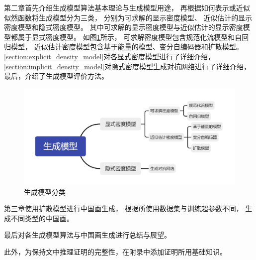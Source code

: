 第二章首先介绍生成模型算法基本理论与生成模型用途，
再根据如何表示或近似似然函数将生成模型分为三类，
分别为可求解的显示密度模型、
近似估计的显示密度模型和隐式密度模型。
其中可求解的显示密度模型与近似估计的显示密度模型都属于显式密度模型。
如图{\ref{fig:gennerative_models}}所示，
可求解密度模型包含规范化流模型和自回归模型，
近似估计密度模型包含基于能量的模型、变分自编码器和扩散模型。
{\ref{section:explicit_density_model}}对各显式密度模型进行了详细介绍，
{\ref{section:implicit_density_model}}对隐式密度模型生成对抗网络进行了详细介绍，
最后，介绍了生成模型评价方法。
\begin{figure}[ht]
    \centering
    \includegraphics[width=\textwidth]{figures/gennerative_models}
    \caption{生成模型分类}\label{fig:gennerative_models}
\end{figure}



第三章使用扩散模型进行中国画生成，
根据所使用数据集与训练超参数不同，
生成不同类型的中国画。

最后对各生成模型算法与中国画生成进行总结与展望。

此外，为保持文中推理证明的完整性，在附录中添加证明所用基础知识。

